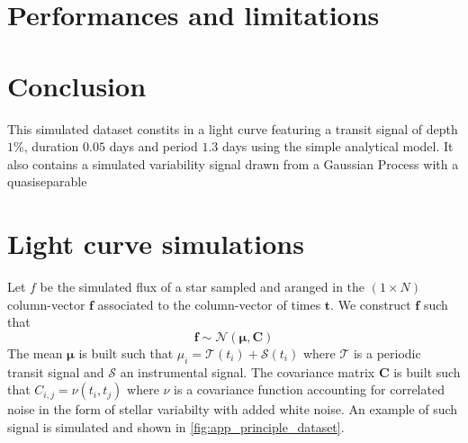 \documentclass{aastex631}
\begin{document}
\section{Performances and limitations}\label{perf}

\section{Conclusion}

This simulated dataset constits in a light curve featuring a transit signal of depth $1$\%, duration $0.05$ days and period $1.3$ days using the simple \citealt{protopapas} analytical model. It also contains a simulated variability signal drawn from a Gaussian Process with a quasiseparable 

\newpage
\appendix
\section{Light curve simulations}\label{app_principle_simulations}



Let $f$ be the simulated flux of a star sampled and aranged in the $(1\times N)$ column-vector $\bm{f}$ associated to the column-vector of times $\bm{t}$. We construct $\bm{f}$ such that
$$
    \bm{f} \sim \mathcal{N}(\bm{\mu}, \bm{C})
$$
The mean $\bm{\mu}$ is built such that $\mu_i = \mathcal{T}(t_i) + \mathcal{S}(t_i)$ where $\mathcal{T}$ is a periodic transit signal and $\mathcal{S}$ an instrumental signal. The covariance matrix $\bm{C}$ is built such that $C_{i, j} = \nu(t_i, t_j)$ where $\nu$ is a covariance function accounting for correlated noise in the form of stellar variabilty with added white noise. An example of such signal is simulated and shown in \autoref{fig:app_principle_dataset}.
\end{document}
